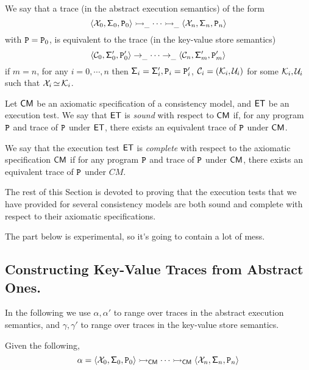 \begin{definition}
We say that a trace (in the abstract execution semantics) of the form
\[
\langle \mathcal{X}_0, \mathsf{\Sigma}_{0}, \texttt{P}_0 \rangle \rightarrowtail_{\_} \cdots \rightarrowtail_{\_} \langle \mathcal{X}_{n}, \mathsf{\Sigma}_{n}, \texttt{P}_{n} \rangle
\]
with $\texttt{P} = \texttt{P}_0$, is equivalent to the trace (in the key-value store semantics)
\[
\langle \mathcal{C}_0, \mathsf{\Sigma}'_{0}, \texttt{P}'_0 \rangle \rightarrow_{\_} \cdots \rightarrow_{\_} \langle \mathcal{C}_{n}, \mathsf{\Sigma}'_{m}, \texttt{P}'_m \rangle
\]
if $m = n$, for any $i=0,\cdots, n$ then $\mathsf{\Sigma}_{i} = \mathsf{\Sigma}'_{i}, \texttt{P}_{i} = \texttt{P}'_{i}$, 
$\mathcal{C}_{i} = (\mathcal{K}_i, \mathcal{U}_i)$ for some $\mathcal{K}_i, \mathcal{U}_{i}$ such that $\mathcal{X}_{i} \mathop{\simeq} \mathcal{K}_{i}$.

\end{definition}

\begin{definition}
Let $\mathsf{CM}$ be an axiomatic specification of a consistency model, and $\mathsf{ET}$ be an execution test. 
We say that $\mathsf{ET}$ is \emph{sound} with respect to $\mathsf{CM}$ if, for any program $\texttt{P}$ and 
trace of $\texttt{P}$ under $\mathsf{ET}$, there exists an equivalent trace of $\texttt{P}$ under $\mathsf{CM}$.

We say that the execution test $\mathsf{ET}$ is \emph{complete} with respect to the axiomatic specification $\mathsf{CM}$ 
if for any program $\texttt{P}$ and trace of $\texttt{P}$ under $\mathsf{CM}$, there exists an equivalent trace of 
$\texttt{P}$ under $CM$.
\end{definition}

The rest of this Section is devoted to proving that the execution tests that we have provided 
for several consistency models are both sound and complete with respect to their axiomatic 
specifications.

\ac{The part below is experimental, so it's going to contain a lot of mess.}

\subsection{Constructing Key-Value Traces from Abstract Ones.}
In the following we use $\alpha, \alpha'$ to range over traces in the 
abstract execution semantics, and $\gamma, \gamma'$ to range 
over traces in the key-value store semantics.

Given the following,
\[
\alpha = \langle \mathcal{X}_0, \mathsf{\Sigma}_0, \texttt{P}_0 \rangle \rightarrowtail_{\mathsf{CM}} \cdots \rightarrowtail_{\mathsf{CM}} 
\langle \mathcal{X}_n, \mathsf{\Sigma}_n, \texttt{P}_n \rangle
\]

